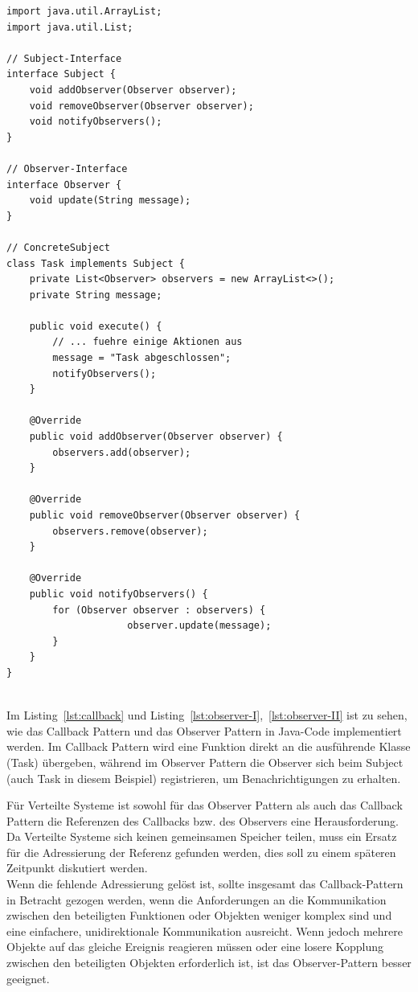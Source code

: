 \begin{minipage}{\textwidth}
\begin{lstlisting}[caption={Observer Pattern - ConcreteSubject},captionpos=b,label={lst:observer-I}]
import java.util.ArrayList;
import java.util.List;

// Subject-Interface
interface Subject {
    void addObserver(Observer observer);
    void removeObserver(Observer observer);
    void notifyObservers();
}

// Observer-Interface
interface Observer {
    void update(String message);
}

// ConcreteSubject
class Task implements Subject {
    private List<Observer> observers = new ArrayList<>();
    private String message;

    public void execute() {
        // ... fuehre einige Aktionen aus
        message = "Task abgeschlossen";
        notifyObservers();
    }

    @Override
    public void addObserver(Observer observer) {
        observers.add(observer);
    }

    @Override
    public void removeObserver(Observer observer) {
        observers.remove(observer);
    }

    @Override
    public void notifyObservers() {
        for (Observer observer : observers) {
                     observer.update(message);
        }
    }
}


\end{lstlisting}
\end{minipage}

Im Listing~\ref{lst:callback} und Listing~\ref{lst:observer-I},~\ref{lst:observer-II} ist zu sehen, wie das Callback Pattern und das Observer Pattern in Java-Code implementiert werden. Im Callback Pattern wird eine Funktion direkt an die ausführende Klasse (Task) übergeben, während im Observer Pattern die Observer sich beim Subject (auch Task in diesem Beispiel) registrieren, um Benachrichtigungen zu erhalten.

Für Verteilte Systeme ist sowohl für das Observer Pattern als auch das Callback Pattern die Referenzen des Callbacks bzw. des Observers eine Herausforderung. Da Verteilte Systeme sich keinen gemeinsamen Speicher teilen, muss ein Ersatz für die Adressierung der Referenz gefunden werden, dies soll zu einem späteren Zeitpunkt diskutiert werden. \\

Wenn die fehlende Adressierung gelöst ist, sollte insgesamt das Callback-Pattern in Betracht gezogen werden, wenn die Anforderungen an die Kommunikation zwischen den beteiligten Funktionen oder Objekten weniger komplex sind und eine einfachere, unidirektionale Kommunikation ausreicht. Wenn jedoch mehrere Objekte auf das gleiche Ereignis reagieren müssen oder eine losere Kopplung zwischen den beteiligten Objekten erforderlich ist, ist das Observer-Pattern besser geeignet.

